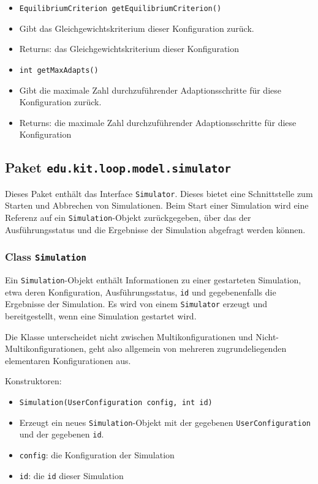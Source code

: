 \documentclass[parskip=full,11pt]{scrartcl}
\begin{document}
\begin{itemize}
\item \texttt{EquilibriumCriterion getEquilibriumCriterion()}
\item[] Gibt das Gleichgewichtskriterium dieser Konfiguration zurück.
\item[] Returns: das Gleichgewichtskriterium dieser Konfiguration

\item \texttt{int getMaxAdapts()}
\item[] Gibt die maximale Zahl durchzuführender Adaptionsschritte für diese Konfiguration zurück.
\item[] Returns: die maximale Zahl durchzuführender Adaptionsschritte für diese Konfiguration
\end{itemize}

\subsection{Paket \texttt{edu.kit.loop.model.simulator}}
Dieses Paket enthält das Interface \texttt{Simulator}. Dieses bietet eine Schnittstelle zum Starten und Abbrechen von Simulationen. Beim Start einer Simulation wird eine Referenz auf ein \texttt{Simulation}-Objekt zurückgegeben, über das der Ausführungsstatus und die Ergebnisse der Simulation abgefragt werden können.

\subsubsection{Class \texttt{Simulation}}
Ein \texttt{Simulation}-Objekt enthält Informationen zu einer gestarteten Simulation, etwa deren Konfiguration, Ausführungsstatus, \texttt{id} und gegebenenfalls die Ergebnisse der Simulation. Es wird von einem \texttt{Simulator} erzeugt und bereitgestellt, wenn eine Simulation gestartet wird.

Die Klasse unterscheidet nicht zwischen Multikonfigurationen und Nicht-Multikonfigurationen, geht also allgemein von mehreren zugrundeliegenden elementaren Konfigurationen aus.

Konstruktoren:
\begin{itemize} \itemsep -10pt
\item \texttt{Simulation(UserConfiguration config, int id)}
\item[] Erzeugt ein neues \texttt{Simulation}-Objekt mit der gegebenen \texttt{UserConfiguration} und der gegebenen \texttt{id}.
\item[] \texttt{config}: die Konfiguration der Simulation
\item[] \texttt{id}: die \texttt{id} dieser Simulation
\end{itemize}
\end{document}
